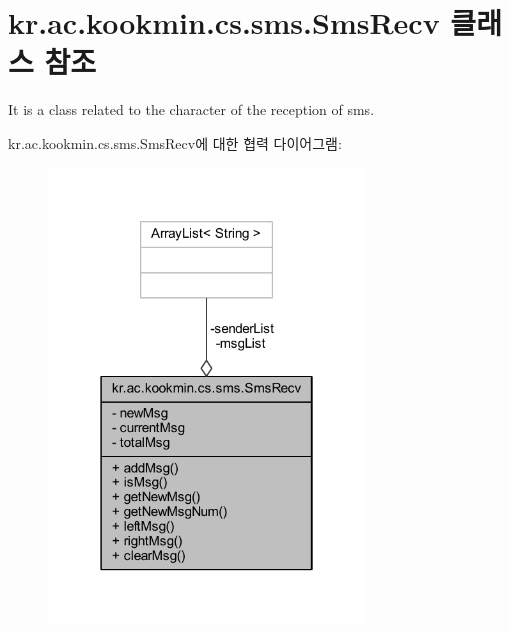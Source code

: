 \hypertarget{classkr_1_1ac_1_1kookmin_1_1cs_1_1sms_1_1_sms_recv}{}\section{kr.\+ac.\+kookmin.\+cs.\+sms.\+Sms\+Recv 클래스 참조}
\label{classkr_1_1ac_1_1kookmin_1_1cs_1_1sms_1_1_sms_recv}


It is a class related to the character of the reception of sms.  




kr.\+ac.\+kookmin.\+cs.\+sms.\+Sms\+Recv에 대한 협력 다이어그램\+:\nopagebreak
\begin{figure}[H]
\begin{center}
\leavevmode
\includegraphics[width=238pt]{classkr_1_1ac_1_1kookmin_1_1cs_1_1sms_1_1_sms_recv__coll__graph}
\end{center}
\end{figure}
